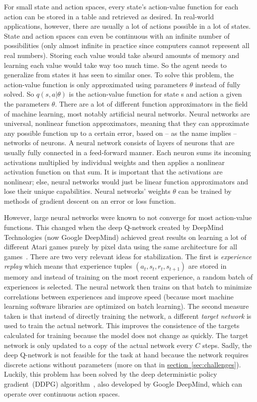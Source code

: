 \documentclass[a4paper,titlepage]{article}
\begin{document}
For small state and action spaces, every state's action-value function for each action can be stored in a table and retrieved as desired. In real-world applications, however, there are usually a lot of actions possible in a lot of states. State and action spaces can even be continuous with an infinite number of possibilities (only almost infinite in practice since computers cannot represent all real numbers). Storing each value would take absurd amounts of memory and learning each value would take way too much time. So the agent needs to generalize from states it has seen to similar ones. To solve this problem, the action-value function is only approximated using parameters $\theta$ instead of fully solved. So $q(s, a | \theta)$ is the action-value function for state s and action a given the parameters $\theta$. There are a lot of different function approximators in the field of machine learning, most notably artificial neural networks. Neural networks are universal, nonlinear function approximators, meaning that they can approximate any possible function up to a certain error, based on -- as the name implies -- networks of neurons. A neural network consists of layers of neurons that are usually fully connected in a feed-forward manner. Each neuron sums its incoming activations multiplied by individual weights and then applies a nonlinear activation function on that sum.  %
It is important that the activations are nonlinear; else, neural networks would just be linear function approximators and lose their unique capabilities.
Neural networks' weights $\theta$ can be trained by methods of gradient descent on an error or loss function. %

However, large neural networks were known to not converge for most action-value functions. This changed when the deep Q-network created by DeepMind Technologies (now Google DeepMind) achieved great results on learning a lot of different Atari games purely by pixel data using the same architecture for all games~\cite{nature}. There are two very relevant ideas for stabilization. The first is \emph{experience replay} which means that experience tuples $(a_t, s_t, r_t, s_{t+1})$ are stored in memory and instead of training on the most recent experience, a random batch of experiences is selected. The neural network then trains on that batch to minimize correlations between experiences and improve speed (because most machine learning software libraries are optimized on batch learning). The second measure taken is that instead of directly training the network, a different \emph{target network} is used to train the actual network. This improves the consistence of the targets calculated for training because the model does not change as quickly. The target network is only updated to a copy of the actual network every $C$ steps. Sadly, the deep Q-network is not feasible for the task at hand because the network requires discrete actions without parameters (more on that in \hyperref[sec:challenges]{section~\ref*{sec:challenges}}). Luckily, this problem has been solved by the deep deterministic policy gradient~(DDPG) algorithm~\cite{ddpg}, also developed by Google DeepMind, which can operate over continuous action spaces.
\end{document}
